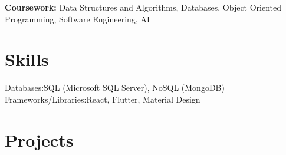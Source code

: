 \documentclass[]{resume-openfont}
\newcommand{\courseWork}[1]{\textbf{Coursework:} #1}
\begin{document}
\courseWork{Data Structures and Algorithms, Databases, Object Oriented Programming, Software Engineering, AI}
\sectionsep

\section{Skills}

 \begin{skillList}
     {Databases:}{SQL (Microsoft SQL Server), NoSQL (MongoDB)}
     \\
     {Frameworks/Libraries:}{React, Flutter, Material Design}%
     \\
 \end{skillList}
 \sectionsep


\section{Projects}
\end{document}

